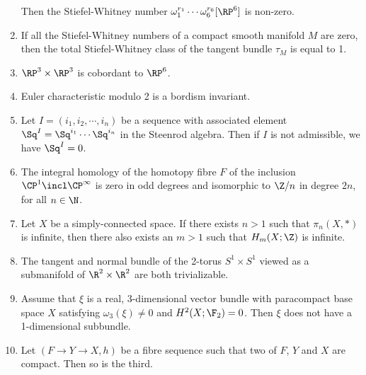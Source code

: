 \begin{questions*}
\begin{enumerate}
			Then the Stiefel-Whitney number $\omega_1^{r_1} \cdots \omega_6^{r_6}[\RP^6]$ is non-zero.
		\item If all the Stiefel-Whitney numbers of a compact smooth manifold $M$ are zero, then the total Stiefel-Whitney class of the tangent bundle $\tau_M$ is equal to 1.
		\item $\RP^3 \times \RP^3$ is cobordant to $\RP^6$.
		\item Euler characteristic modulo 2 is a bordism invariant.
		\item Let $I = (i_1, i_2, \cdots, i_n)$ be a sequence with associated element $\Sq^I = \Sq^{i_1} \cdots \Sq^{i_n}$ in the Steenrod algebra.
			Then if $I$ is not admissible, we have $\Sq^I = 0$.
		\item The integral homology of the homotopy fibre $F$ of the inclusion $\CP^1 \incl \CP^\infty$ is zero in odd degrees and isomorphic to $\Zn{n}$ in degree $2n$, for all $n \in \N$.
		\item Let $X$ be a simply-connected space.
			If there exists $n > 1$ such that $\pi_n(X, *)$ is infinite, then there also exists an $m > 1$ such that $H_m(X; \Z)$ is infinite.
		\item The tangent and normal bundle of the 2-torus $S^1 \times S^1$ viewed as a submanifold of $\R^2 \times \R^2$ are both trivializable.
		\item Assume that $\xi$ is a real, 3-dimensional vector bundle with paracompact base space $X$ satisfying $\omega_3(\xi) \neq 0$ and $H^2(X; \F_2) = 0$.
			Then $\xi$ does not have a 1-dimensional subbundle.
		\item Let $(F \to Y \to X, h)$ be a fibre sequence such that two of $F$, $Y$ and $X$ are compact.
			Then so is the third.
	\end{enumerate}
\end{questions*}
